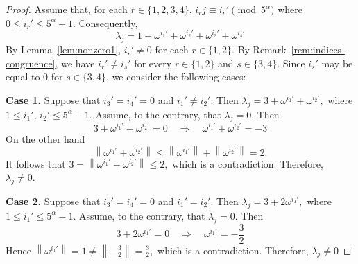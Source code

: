 \documentclass[12pt]{article}
\begin{document}
  \begin{proof}
Assume that, for each $r\in\{1,2,3,4\}$,
$	i_rj \equiv i_r' \pmod{5^\alpha}$
where $0\le i_r'\le 5^\alpha-1$. Consequently,
\begin{equation}\label{eq:lambdaj9}
	\lambda_j=1+\omega^{i_1'}+\omega^{i_2'}+\omega^{i_3'}+\omega^{i_4'}
\end{equation}
By Lemma~\ref{lem:nonzero1}, $i_r'\neq 0$ for each $r\in\{1,2\}$.
By Remark~\ref{rem:indices-congruence}, we have $i_r'\neq i_s'$ for every $r\in\{1,2\}$ and $s\in\{3,4\}$. Since $i_s'$ may be equal to $0$ for $s\in\{3,4\}$, we consider the following cases:

\textbf{Case 1.}
Suppose that $i_3'=i_4'=0$ and $i_1'\neq i_2'$. Then
$
\lambda_j=3+\omega^{i_1'}+\omega^{i_2'},
$
where
$
1\le i_1',\,i_2'\le 5^\alpha-1.
$ Assume, to the contrary, that $\lambda_j=0$. Then
\[
3+\omega^{i_1'}+\omega^{i_2'}=0
\quad\Longrightarrow\quad
\omega^{i_1'}+\omega^{i_2'}=-3
\]
On the other hand
\[
\left\|\omega^{i_1'}+\omega^{i_2'}\right\|
\le
\left\|\omega^{i_1'}\right\|
+
\left\|\omega^{i_2'}\right\|
=2.
\]
It follows that
$
3=\left\|\omega^{i_1'}+\omega^{i_2'}\right\|\le2,
$
which is a contradiction. Therefore,
$
\lambda_j\neq0.
$

\medskip

\textbf{Case 2.} Suppose that $i_3'=i_4'=0$ and $i_1'=i_2'$. Then
$
\lambda_j=3+2\omega^{i_1'},
$
where $1\le i_1'\le 5^\alpha-1$. Assume, to the contrary, that $\lambda_j=0$. Then
\[
3+2\omega^{i_1'}=0
\quad\Longrightarrow\quad
\omega^{i_1'}=-\frac{3}{2}
\]
Hence $
\left\|\omega^{i_1'}\right\|=1\neq\left\|-\frac{3}{2}\right\|=\frac{3}{2},
$
which is a contradiction. Therefore,
$
\lambda_j\neq0
$

\medskip


\end{proof}
\end{document}
